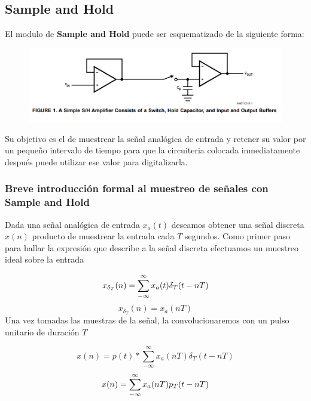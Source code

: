 %

%
\subsection{Sample and Hold}

El modulo de \textbf{Sample and Hold}  puede ser esquematizado de la siguiente forma:

\begin{figure}[H]
	\centering
	\includegraphics[width=0.7\linewidth]{ImagenesEjercicio4/SyH}
	\caption{}
	\label{fig:syh}
\end{figure}
Su objetivo es el de muestrear la señal analógica de entrada y retener su valor por un pequeño intervalo de tiempo para que la circuiteria colocada inmediatamente después puede utilizar ese valor para digitalizarla.
\subsubsection{Breve introducción formal al muestreo de señales con Sample and Hold}
Dada una señal analógica de entrada $x_{a}(t)$ deseamos obtener una señal discreta $x(n)$ producto de muestrear la entrada cada $T$ segundos.
Como primer paso para hallar la expresión que describe a la señal discreta efectuamos un muestreo ideal sobre la entrada

\begin{equation}
	\centering
	x_{\delta_{T}}(n)=\sum_{-\infty}^{\infty} x_{a}(t)\delta_{T}(t-nT)
	\label{
		muestreo_ideal}
\end{equation}
$$x_{\delta_{T}}(n) =x_{a}(nT) $$
Una vez tomadas las muestras de la señal, la convolucionaremos con un pulso unitario de duración $T$


$$x(n)=p(t)*\sum_{-\infty}^{\infty} x_{a}(nT)\delta_{T}(t-nT)$$
\begin{equation}
\centering
x(n)=\sum_{-\infty}^{\infty} x_{a}(nT)p_{T}(t-nT)
\end{equation}

